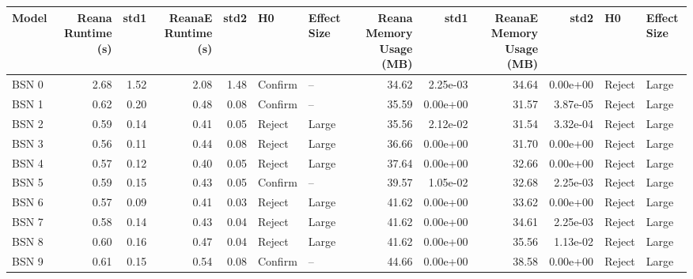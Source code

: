\begin{tabular}{lrrrrllrrrrll}
\toprule
  Model &  Reana Runtime (s) &   std1 &  ReanaE Runtime (s) &   std2 &       H0 & Effect Size &  Reana Memory Usage (MB) &      std1 &  ReanaE Memory Usage (MB) &      std2 &       H0 & Effect Size \\
\midrule
  BSN 0 &               2.68 &   1.52 &                2.08 &   1.48 &  Confirm &          -- &                    34.62 &  2.25e-03 &                     34.64 &  0.00e+00 &   Reject &       Large \\
  BSN 1 &               0.62 &   0.20 &                0.48 &   0.08 &  Confirm &          -- &                    35.59 &  0.00e+00 &                     31.57 &  3.87e-05 &   Reject &       Large \\
  BSN 2 &               0.59 &   0.14 &                0.41 &   0.05 &   Reject &       Large &                    35.56 &  2.12e-02 &                     31.54 &  3.32e-04 &   Reject &       Large \\
  BSN 3 &               0.56 &   0.11 &                0.44 &   0.08 &   Reject &       Large &                    36.66 &  0.00e+00 &                     31.70 &  0.00e+00 &   Reject &       Large \\
  BSN 4 &               0.57 &   0.12 &                0.40 &   0.05 &   Reject &       Large &                    37.64 &  0.00e+00 &                     32.66 &  0.00e+00 &   Reject &       Large \\
  BSN 5 &               0.59 &   0.15 &                0.43 &   0.05 &  Confirm &          -- &                    39.57 &  1.05e-02 &                     32.68 &  2.25e-03 &   Reject &       Large \\
  BSN 6 &               0.57 &   0.09 &                0.41 &   0.03 &   Reject &       Large &                    41.62 &  0.00e+00 &                     33.62 &  0.00e+00 &   Reject &       Large \\
  BSN 7 &               0.58 &   0.14 &                0.43 &   0.04 &   Reject &       Large &                    41.62 &  0.00e+00 &                     34.61 &  2.25e-03 &   Reject &       Large \\
  BSN 8 &               0.60 &   0.16 &                0.47 &   0.04 &   Reject &       Large &                    41.62 &  0.00e+00 &                     35.56 &  1.13e-02 &   Reject &       Large \\
  BSN 9 &               0.61 &   0.15 &                0.54 &   0.08 &  Confirm &          -- &                    44.66 &  0.00e+00 &                     38.58 &  0.00e+00 &   Reject &       Large \\

\end{tabular}
